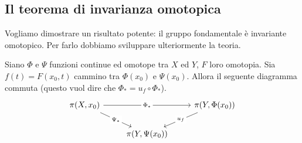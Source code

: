 \subsection{\textcolor{TopAlg}{\textbf{Il teorema di invarianza omotopica}}}
Vogliamo dimostrare un risultato potente: il gruppo fondamentale è invariante omotopico. Per farlo dobbiamo sviluppare ulteriormente la teoria.
\begin{lemma}
	Siano $\Phi$ e $\Psi$ funzioni continue ed omotope tra $X$ ed $Y$, $F$ loro omotopia. Sia $f(t)=F(x_0,t)$ cammino tra $\Phi(x_0)$ e $\Psi(x_0)$. Allora il seguente diagramma commuta (questo vuol dire che $\Phi_*=u_f\circ \Phi_*$).
	\begin{equation*}
	\begin{tikzcd}
	{\pi(X,x_0)} \arrow[rd, "\Psi_*" description] \arrow[rr, "\Phi_*" description] &                    & {\pi(Y,\Phi(x_0))} \arrow[ld, "u_f" description] \\
	& {\pi(Y,\Psi(x_0))} &                                                 
	\end{tikzcd}
	\end{equation*}
\end{lemma}
